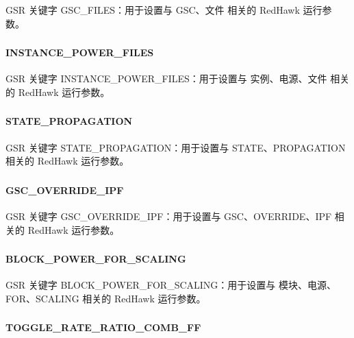 GSR 关键字 GSC_FILES：用于设置与 GSC、文件 相关的 RedHawk 运行参数。

\subsubsection{}
\paragraph*{INSTANCE_POWER_FILES}

GSR 关键字 INSTANCE_POWER_FILES：用于设置与 实例、电源、文件 相关的 RedHawk 运行参数。

\subsubsection{}
\paragraph*{STATE_PROPAGATION}

GSR 关键字 STATE_PROPAGATION：用于设置与 STATE、PROPAGATION 相关的 RedHawk 运行参数。

\subsubsection{}
\paragraph*{GSC_OVERRIDE_IPF}

GSR 关键字 GSC_OVERRIDE_IPF：用于设置与 GSC、OVERRIDE、IPF 相关的 RedHawk 运行参数。

\subsubsection{}
\paragraph*{BLOCK_POWER_FOR_SCALING}

GSR 关键字 BLOCK_POWER_FOR_SCALING：用于设置与 模块、电源、FOR、SCALING 相关的 RedHawk 运行参数。

\subsubsection{}
\paragraph*{TOGGLE_RATE_RATIO_COMB_FF}


